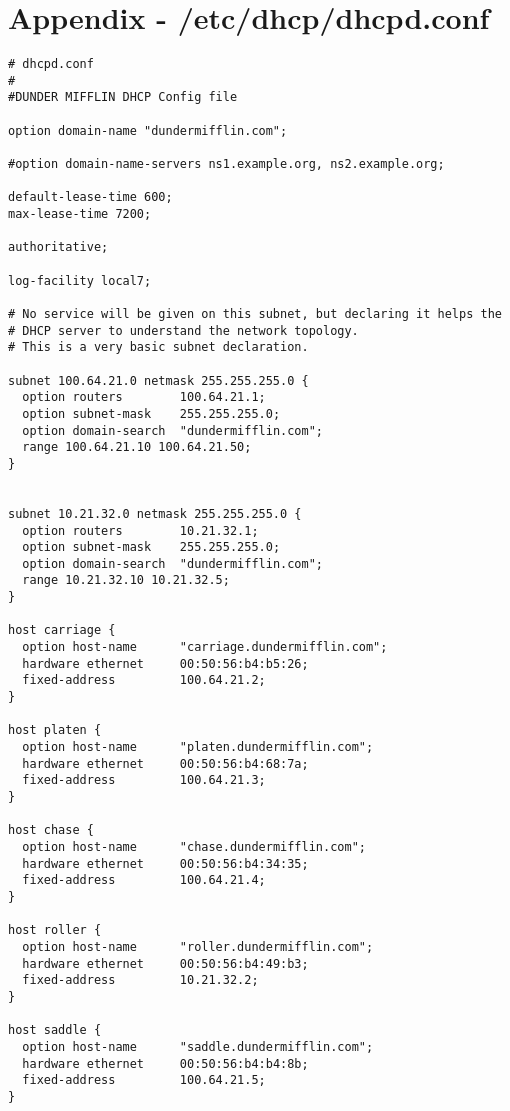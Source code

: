 \documentclass[11pt,onside]{article}
\begin{document}
\section{Appendix - /etc/dhcp/dhcpd.conf}
\begin{lstlisting}
# dhcpd.conf
#
#DUNDER MIFFLIN DHCP Config file

option domain-name "dundermifflin.com";

#option domain-name-servers ns1.example.org, ns2.example.org;

default-lease-time 600;
max-lease-time 7200;

authoritative;

log-facility local7;

# No service will be given on this subnet, but declaring it helps the
# DHCP server to understand the network topology.
# This is a very basic subnet declaration.

subnet 100.64.21.0 netmask 255.255.255.0 {
  option routers        100.64.21.1;
  option subnet-mask    255.255.255.0;
  option domain-search  "dundermifflin.com";
  range 100.64.21.10 100.64.21.50;
}


subnet 10.21.32.0 netmask 255.255.255.0 {
  option routers        10.21.32.1;
  option subnet-mask    255.255.255.0;
  option domain-search  "dundermifflin.com";
  range 10.21.32.10 10.21.32.5;
}

host carriage {
  option host-name      "carriage.dundermifflin.com";
  hardware ethernet     00:50:56:b4:b5:26;
  fixed-address         100.64.21.2;
}

host platen {
  option host-name      "platen.dundermifflin.com";
  hardware ethernet     00:50:56:b4:68:7a;
  fixed-address         100.64.21.3;
}

host chase {
  option host-name      "chase.dundermifflin.com";
  hardware ethernet     00:50:56:b4:34:35;
  fixed-address         100.64.21.4;
}

host roller {
  option host-name      "roller.dundermifflin.com";
  hardware ethernet     00:50:56:b4:49:b3;
  fixed-address         10.21.32.2;
}

host saddle {
  option host-name      "saddle.dundermifflin.com";
  hardware ethernet     00:50:56:b4:b4:8b;
  fixed-address         100.64.21.5;
}

\end{lstlisting}
\end{document}
